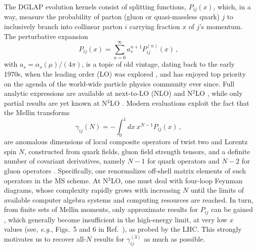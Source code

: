 \documentclass[
 twocolumn,
 superscriptaddress,
 preprintnumbers,
 nofootinbib,
 amsmath,amssymb,
 aps,
 prl
 ]{revtex4-2}
\begin{document}
The DGLAP evolution kernels consist of splitting functions, $P_{ij}(x)$, which, in a way, measure the probability of parton (gluon or quasi-massless quark) $j$ to inclusively branch into collinear parton $i$ carrying fraction $x$ of $j$'s momentum.
The perturbative expansion
\begin{equation}
P_{ij}(x)=\sum_{n=0}^{\infty}a_s^{n+1}P_{ij}^{(n)}(x)\,,
\end{equation}
with $a_s=\alpha_s(\mu)/(4\pi)$, is a topic of old vintage, dating back to the early 1970s, when the leading order (LO) was explored \cite{Gribov:1972ri,Gribov:1972rt,Altarelli:1977zs,Dokshitzer:1977sg,Gross:1973ju,Gross:1974cs}, and has enjoyed top priority on the agenda of the world-wide particle physics community ever since.
Full analytic expressions are available at next-to-LO (NLO) \cite{Floratos:1977au,GonzalezArroyo:1979df,Gonzalez-Arroyo:1979kjx,Curci:1980uw,Furmanski:1980cm} and N${}^2$LO \cite{Larin:1993vu,Larin:1996wd,Moch:2004pa,Vogt:2004mw,Ablinger:2014nga,Blumlein:2021enk,Blumlein:2022gpp,Gehrmann:2023ksf}, while only partial results are yet known at N${}^3$LO \cite{Gracey:1994nn,Velizhanin:2011es,Velizhanin:2014fua,Davies:2016jie,Moch:2017uml,Davies:2017hyl,Moch:2018wjh,Das:2020adl,Moch:2021qrk,Falcioni:2023luc,Gehrmann:2023cqm,Falcioni:2023vqq,Falcioni:2023tzp,Moch:2023tdj,Gehrmann:2023iah,Falcioni:2024xyt,Falcioni:2024xav,Falcioni:2024qpd,Kniehl:2025jfs,Kniehl:2025ttz,Falcioni:2025hfz,Kniehl:2026axe,Gehrmann:2026qbl}.
Modern evaluations exploit the fact that the Mellin transforms
\begin{equation}
  \gamma_{ij}(N)=-\int_0^1 dx\ x^{N-1} P_{ij}(x)\,,
\label{eq:mel}
\end{equation}
are anomalous dimensions of local composite operators of twist two and Lorentz spin $N$, constructed from quark fields, gluon field strength tensors, and a definite number of covariant derivatives, namely $N-1$ for quark operators and $N-2$ for gluon operators \cite{Dokshitzer:1977sg}.
Specifically, one renormalizes off-shell matrix elements of such operators in the $\overline{\mathrm{MS}}$ scheme.
At N$^3$LO, one must deal with four-loop Feynman diagrams, whose complexity rapidly grows with increasing $N$ until the limits of available computer algebra systems and computing resources are reached.
In turn, from finite sets of Mellin moments, only approximate results for $P_{ij}$ can be gained \cite{Larin:1996wd,Moch:2017uml,Moch:2023tdj,Falcioni:2024xyt,Falcioni:2025hfz}, which generally become insufficient in the high-energy limit, at very low $x$ values (see, {\it e.g.}, Figs.~5 and 6 in Ref.~\cite{Moch:2017uml}), as probed by the LHC.
This strongly motivates us to recover all-$N$ results for $\gamma_{ij}^{(3)}$ as much as possible.
\end{document}
